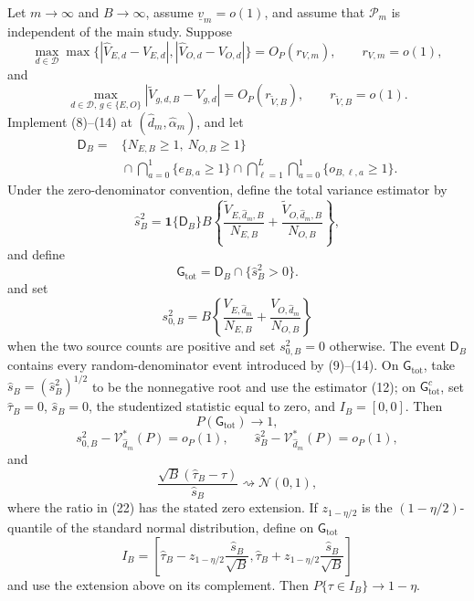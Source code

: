 Let \(m\to\infty\) and \(B\to\infty\), assume \(\underline v_m=o(1)\), and assume that \(\mathcal P_m\) is independent of the main study.  Suppose
\[
 \max_{d\in\mathcal D}\max\{|\widehat V_{E,d}-V_{E,d}|,
 |\widehat V_{O,d}-V_{O,d}|\}=O_P(r_{V,m}),
 \qquad r_{V,m}=o(1),                                      \tag{15}
\]
and
\[
 \max_{d\in\mathcal D,\,g\in\{E,O\}}
 |\widetilde V_{g,d,B}-V_{g,d}|=O_P(r_{\widetilde V,B}),
 \qquad r_{\widetilde V,B}=o(1).                           \tag{16}
\]
Implement (8)--(14) at \((\widehat d_m,\widehat\alpha_m)\), and let
\[
\begin{aligned}
 \mathsf D_B
 ={}&\{N_{E,B}\ge1,\ N_{O,B}\ge1\}\\
 &{}\cap\bigcap_{a=0}^1\{e_{B,a}\ge1\}
 \cap\bigcap_{\ell=1}^L\bigcap_{a=0}^1\{o_{B,\ell,a}\ge1\}.
\end{aligned}
\]
Under the zero-denominator convention, define the total variance estimator by
\[
 \widehat s_B^2
 =\mathbf 1\{\mathsf D_B\}B\left\{
 \frac{\widetilde V_{E,\widehat d_m,B}}{N_{E,B}}
 +\frac{\widetilde V_{O,\widehat d_m,B}}{N_{O,B}}
 \right\},                                                  \tag{17}
\]
and define
\[
 \mathsf G_{\mathrm{tot}}
 =\mathsf D_B\cap\{\widehat s_B^2>0\}.                      \tag{18}
\]
and set
\[
 s_{0,B}^2
 =B\left\{
 \frac{V_{E,\widehat d_m}}{N_{E,B}}
 +\frac{V_{O,\widehat d_m}}{N_{O,B}}
 \right\}                                                   \tag{19}
\]
when the two source counts are positive and set \(s_{0,B}^2=0\) otherwise.  The event \(\mathsf D_B\) contains every random-denominator event introduced by (9)--(14).  On \(\mathsf G_{\mathrm{tot}}\), take \(\widehat s_B=(\widehat s_B^2)^{1/2}\) to be the nonnegative root and use the estimator (12); on \(\mathsf G_{\mathrm{tot}}^c\), set \(\widehat\tau_B=0\), \(\widehat s_B=0\), the studentized statistic equal to zero, and \(I_B=[0,0]\).  Then
\[
 P(\mathsf G_{\mathrm{tot}})\longrightarrow1,               \tag{20}
\]
\[
 s_{0,B}^2-\mathcal V_{\widehat d_m}^*(P)=o_P(1),
 \qquad
 \widehat s_B^2-\mathcal V_{\widehat d_m}^*(P)=o_P(1),      \tag{21}
\]
and
\[
 \frac{\sqrt B(\widehat\tau_B-\tau)}{\widehat s_B}
 \rightsquigarrow\mathcal N(0,1),                           \tag{22}
\]
where the ratio in (22) has the stated zero extension.  If \(z_{1-\eta/2}\) is the \((1-\eta/2)\)-quantile of the standard normal distribution, define on \(\mathsf G_{\mathrm{tot}}\)
\[
 I_B=\left[
 \widehat\tau_B-z_{1-\eta/2}\frac{\widehat s_B}{\sqrt B},
 \widehat\tau_B+z_{1-\eta/2}\frac{\widehat s_B}{\sqrt B}
 \right]                                                    \tag{23}
\]
and use the extension above on its complement.  Then \(P\{\tau\in I_B\}\to1-\eta\).